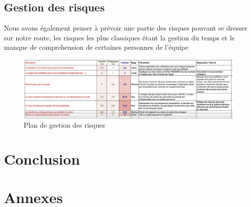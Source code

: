 \documentclass[french,a4paper]{article}
\begin{document}
\subsection{Gestion des risques}
Nous avons également penser à prévoir une partie des risques pouvant se dresser sur notre route, les risques les plus classiques étant 
la gestion du temps et le manque de comprehension de certaines personnes de l'équipe
\begin{figure}[H]
    \centering
    \includegraphics[width=1\textwidth]{img/Plan_gestion_risque.png}
    \caption{Plan de gestion des risques}
\end{figure} 

\section{Conclusion}

\section{Annexes}






\end{document}
